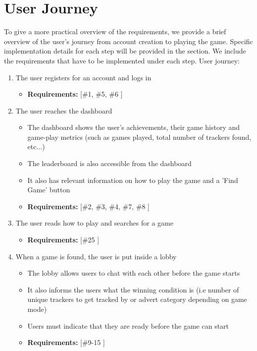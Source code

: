 \documentclass{l4proj}
\begin{document}
\section{User Journey}
To give a more practical overview of the requirements, we provide a brief overview of the user's journey from account creation to playing the game. Specific implementation details for each step will be provided in the  section. We include the requirements that have to be implemented under each step.
User journey:
\begin{enumerate}
    \item The user registers for an account and logs in
    \begin{itemize}
 	\item \textbf{Requirements: } [\#1, \#5, \#6 ]
    \end{itemize}
    \item The user reaches the dashboard
    \begin{itemize}
 	\item The dashboard shows the user's achievements, their game history and game-play metrics (such as games played, total number of trackers found, etc...)
           \item The leaderboard is also accessible from the dashboard
	\item It also has relevant information on how to play the game and a 'Find Game' button 
 	\item \textbf{Requirements: } [\#2, \#3, \#4, \#7, \#8 ]
    \end{itemize}
    \item The user reads how to play and searches for a game
    \begin{itemize}
 	\item \textbf{Requirements: } [\#25 ]
    \end{itemize}
    \item When a game is found, the user is put inside a lobby
    \begin{itemize}
 	\item The lobby allows users to chat with each other before the game starts
           \item It also informs the users what the winning condition is (i.e number of unique trackers to get tracked by or advert category depending on game mode)
           \item Users must indicate that they are ready before the game can start
 	\item \textbf{Requirements: } [\#9-15 ]

\end{itemize}
\end{enumerate}
\end{document}
